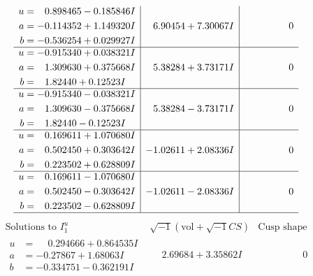 \documentclass[1p]{elsarticle_modified}
\theoremstyle{definition}
\newcommand{\I}{\sqrt{-1}}
\begin{document}
$$\begin{array}{c|c|c}
\begin{aligned}
u &= \phantom{-}0.898465 - 0.185846 I \\
a &= -0.114352 + 1.149320 I \\
b &= -0.536254 + 0.029927 I\end{aligned}
 & \phantom{-}6.90454 + 7.30067 I & \phantom{-0.000000 } 0 \\ \hline\begin{aligned}
u &= -0.915340 + 0.038321 I \\
a &= \phantom{-}1.309630 + 0.375668 I \\
b &= \phantom{-}1.82440 + 0.12523 I\end{aligned}
 & \phantom{-}5.38284 + 3.73171 I & \phantom{-0.000000 } 0 \\ \hline\begin{aligned}
u &= -0.915340 - 0.038321 I \\
a &= \phantom{-}1.309630 - 0.375668 I \\
b &= \phantom{-}1.82440 - 0.12523 I\end{aligned}
 & \phantom{-}5.38284 - 3.73171 I & \phantom{-0.000000 } 0 \\ \hline\begin{aligned}
u &= \phantom{-}0.169611 + 1.070680 I \\
a &= \phantom{-}0.502450 + 0.303642 I \\
b &= \phantom{-}0.223502 + 0.628809 I\end{aligned}
 & -1.02611 + 2.08336 I & \phantom{-0.000000 } 0 \\ \hline\begin{aligned}
u &= \phantom{-}0.169611 - 1.070680 I \\
a &= \phantom{-}0.502450 - 0.303642 I \\
b &= \phantom{-}0.223502 - 0.628809 I\end{aligned}
 & -1.02611 - 2.08336 I & \phantom{-0.000000 } 0\\
 \hline 
 \end{array}$$\newpage$$\begin{array}{c|c|c}  
\text{Solutions to }I^u_{1}& \I (\text{vol} + \sqrt{-1}CS) & \text{Cusp shape}\\
 \hline 
\begin{aligned}
u &= \phantom{-}0.294666 + 0.864535 I \\
a &= -0.27867 + 1.68063 I \\
b &= -0.334751 - 0.362191 I\end{aligned}
 & \phantom{-}2.69684 + 3.35862 I & \phantom{-0.000000 } 0 \\ \hline\begin{aligned}

\end{aligned}
\end{array}$$
\end{document}

